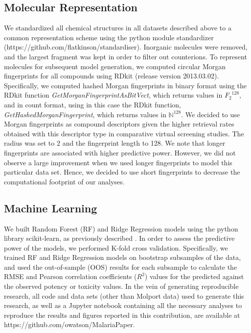 \documentclass[journal=jacsat,manuscript=article]{achemso}
\begin{document}
\subsection*{Molecular Representation}
We standardized all chemical structures in all datasets described above to a common representation scheme using the python module standardizer (https://github.com/flatkinson/standardiser). Inorganic molecules were removed, and the largest fragment was kept in order to filter out counterions\cite{Fourches2010}. 
To represent molecules for subsequent model generation, we computed circular Morgan fingerprints\cite{Rogers2010} for all compounds using RDkit (release version 2013.03.02)\cite{rdkit}.
Specifically, we computed hashed Morgan fingerprints in binary format 
using the RDkit function \textit{GetMorganFingerprintAsBitVect}, which returns values in ${F_2}^{128}$,
and in count format, using in this case the RDkit function, \textit{GetHashedMorganFingerprint}, which returns values in $\mathbb{N}^{128}$.  
We decided to use Morgan fingerprints as compound descriptors given the higher retrieval rates obtained with this descriptor type in comparative virtual screening studies\cite{Koutsoukas2013}. The radius was set to 2 and the fingerprint length to 128. We note that longer fingerprints are associated with higher predictive power\cite{OBoyle2016}. However, we did not observe a large improvement when we used longer fingerprints to model this particular data set. Hence, we decided to use short fingerprints to decrease the computational footprint of our analyses.


\subsection*{Machine Learning}
We built Random Forest (RF) and Ridge Regression models using the python library scikit-learn\cite{scikit}, as previously described \citep{et1:}.
In order to assess the predictive power of the models, we performed K-fold cross validation. Specifically, 
we trained RF and Ridge Regression models on bootstrap subsamples of the data, and used the out-of-sample (OOS) results for each subsample to calculate the RMSE and Pearson correlation coefficients ($R^2$) values for the predicted against the observed potency or toxicity values.
In the vein of generating reproducible research\cite{Walters2013,Landrum2012}, all code and data sets (other than Molport data) used to generate this research, as well as a Jupyter notebook containing all the necessary analyses to reproduce the results and figures reported in this contribution, are available at https://github.com/owatson/MalariaPaper.
\end{document}
